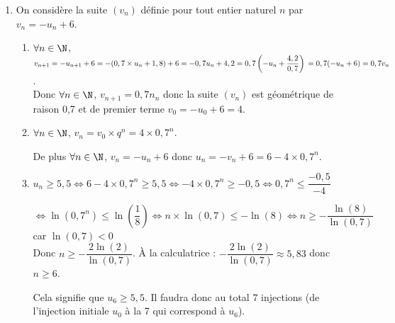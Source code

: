 \begin{enumerate}
\begin{enumerate}
		$l=0,7l+1,8\iff 0,3l=1,8\iff l=6$. Donc $\displaystyle\lim\limits_{n \rightarrow +\infty} u_n=6$
	\end{enumerate}
\item On considère la suite $(v_n)$ définie pour tout entier naturel $n$ par $v_{n}=-u_{n}+6$.
\begin{enumerate}
	\item $\forall n\in \N$, $v_{n+1}=-u_{n+1}+6=-(0,7\times u_n+1,8)+6=-0,7u_n+4,2=0,7\left(-u_n+\dfrac{4,2}{0,7}\right)\\=0,7(-u_n+6)=0,7v_n$.\\
	Donc $\forall n\in \N$, $v_{n+1}=0,7n_n$ donc la suite $\left(v_n\right)$  est géométrique de raison 0,7 et de premier terme $v_0=-u_0+6=4$.
	\item $\forall n\in \N$, $v_n=v_0 \times q^n=4 \times 0,7^n$.
	
De plus  $\forall n\in \N$, $v_n=-u_n+6$ donc $u_n=-v_n+6=6-4\times 0,7^n$.
	 \item $u_n\geqslant 5,5 \iff 6-4\times 0,7^n\geqslant 5,5 \iff -4\times 0,7^n\geqslant -0,5 \iff 0,7^n\leqslant \dfrac{-0,5}{-4}$

$\iff \ln\left(0,7^n\right) \leqslant \ln\left(\dfrac{1}{8}\right) \iff n\times \ln(0,7) \leqslant -\ln(8) \iff n\geqslant -\dfrac{\ln(8)}{\ln(0,7)}$ car $\ln(0,7)<0$\\
Donc $n\geqslant -\dfrac{2\ln(2)}{\ln(0,7)}$. À la calculatrice : $-\dfrac{2\ln(2)}{\ln(0,7)}\approx 5,83$ donc $n\geqslant 6$.

Cela signifie que $u_6\geqslant 5,5$. Il faudra donc au total 7 injections (de l'injection initiale $u_0$ à la 7 qui correspond à $u_6$).
\end{enumerate}
\end{enumerate}

\bigskip

